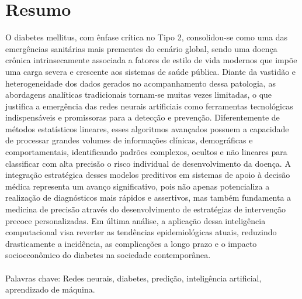 \chapter*{Resumo}
\thispagestyle{empty}

O diabetes mellitus, com ênfase crítica no Tipo 2, consolidou-se como uma das emergências sanitárias mais prementes do cenário global, sendo uma doença crônica intrinsecamente associada a fatores de estilo de vida modernos que impõe uma carga severa e crescente aos sistemas de saúde pública. Diante da vastidão e heterogeneidade dos dados gerados no acompanhamento dessa patologia, as abordagens analíticas tradicionais tornam-se muitas vezes limitadas, o que justifica a emergência das redes neurais artificiais como ferramentas tecnológicas indispensáveis e promissoras para a detecção e prevenção. Diferentemente de métodos estatísticos lineares, esses algoritmos avançados possuem a capacidade de processar grandes volumes de informações clínicas, demográficas e comportamentais, identificando padrões complexos, ocultos e não lineares para classificar com alta precisão o risco individual de desenvolvimento da doença. A integração estratégica desses modelos preditivos em sistemas de apoio à decisão médica representa um avanço significativo, pois não apenas potencializa a realização de diagnósticos mais rápidos e assertivos, mas também fundamenta a medicina de precisão através do desenvolvimento de estratégias de intervenção precoce personalizadas. Em última análise, a aplicação dessa inteligência computacional visa reverter as tendências epidemiológicas atuais, reduzindo drasticamente a incidência, as complicações a longo prazo e o impacto socioeconômico do diabetes na sociedade contemporânea.
\\\\
Palavras chave: Redes neurais, diabetes, predição, inteligência artificial, aprendizado de máquina.